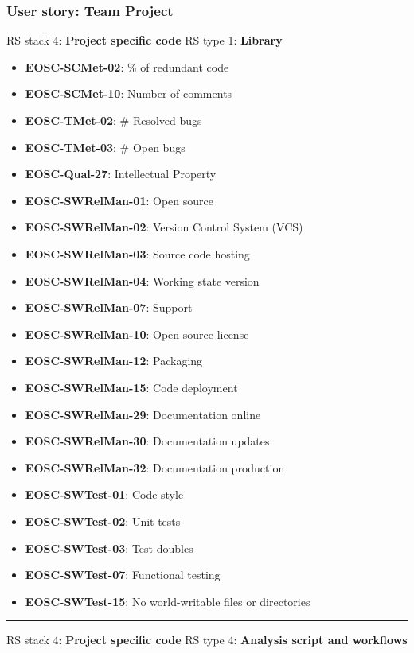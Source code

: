 \subsubsection{User story: Team Project}

RS stack 4: \textbf{Project specific code} \newline
RS type 1: \textbf{Library}

\begin{itemize}
    \item \textbf{EOSC-SCMet-02}: \% of redundant code
    \item \textbf{EOSC-SCMet-10}: Number of comments
    \item \textbf{EOSC-TMet-02}: \# Resolved bugs
    \item \textbf{EOSC-TMet-03}: \# Open bugs
    \item \textbf{EOSC-Qual-27}: Intellectual Property
    \item \textbf{EOSC-SWRelMan-01}: Open source
    \item \textbf{EOSC-SWRelMan-02}: Version Control System (VCS)
    \item \textbf{EOSC-SWRelMan-03}: Source code hosting
    \item \textbf{EOSC-SWRelMan-04}: Working state version
    \item \textbf{EOSC-SWRelMan-07}: Support
    \item \textbf{EOSC-SWRelMan-10}: Open-source license
    \item \textbf{EOSC-SWRelMan-12}: Packaging
    \item \textbf{EOSC-SWRelMan-15}: Code deployment
    \item \textbf{EOSC-SWRelMan-29}: Documentation online
    \item \textbf{EOSC-SWRelMan-30}: Documentation updates
    \item \textbf{EOSC-SWRelMan-32}: Documentation production
    \item \textbf{EOSC-SWTest-01}: Code style
    \item \textbf{EOSC-SWTest-02}: Unit tests
    \item \textbf{EOSC-SWTest-03}: Test doubles
    \item \textbf{EOSC-SWTest-07}: Functional testing
    \item \textbf{EOSC-SWTest-15}: No world-writable files or directories
\end{itemize}
\hrule

RS stack 4: \textbf{Project specific code} \newline
RS type 4: \textbf{Analysis script and workflows}

